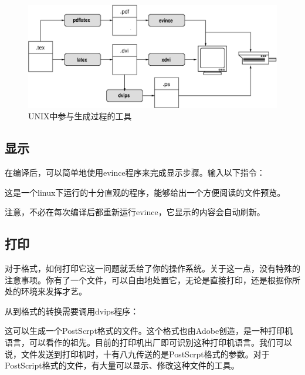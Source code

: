 \begin{figure}[H]
    \centering
    \includegraphics[width = 0.8\linewidth]{img/cycle.eps}
    \caption{UNIX中参与生成过程的工具}
    \label{fig:1.2}
\end{figure}

\subsection{显示}%

在编译后，可以简单地使用\textsf{evince}程序来完成显示步骤。输入以下指令：


这是一个\textsf{linux}下运行的十分直观的程序，能够给出一个方便阅读的文件预览。

\begin{exclamation}
    注意，不必在每次编译后都重新运行evince，它显示的内容会自动刷新。
\end{exclamation}

\subsection{打印}

对于格式，如何打印它这一问题就丢给了你的操作系统。关于这一点，没有特殊的注意事项。你有了一个文件，可以自由地处置它，无论是直接打印，还是根据你所处的环境来发挥才艺。

\begin{ii}
    从到格式的转换需要调用dvips程序：


    这可以生成一个PostScrpt格式的文件。这个格式也由Adobe创造，是一种打印机语言，可以看作的祖先。目前的打印机出厂即可识别这种打印机语言。我们可以说，文件发送到打印机时，十有八九传送的是PostScrpt格式的参数。对于PostScript格式的文件，有大量可以显示、修改这种文件的工具。
\end{ii}

